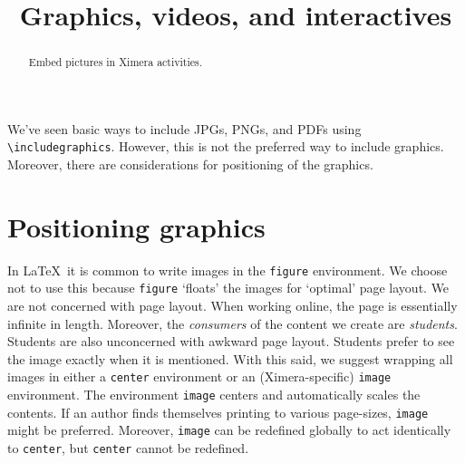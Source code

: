 \documentclass{ximera}
\title{Graphics, videos, and interactives}
\begin{document}
\begin{abstract}
  Embed pictures in Ximera activities.
\end{abstract}
\maketitle

We've seen basic ways to include JPGs, PNGs, and PDFs using
\verb!\includegraphics!. However, this is not the preferred way to include
graphics. Moreover, there are considerations for positioning of the graphics.

\section{Positioning graphics}

In \LaTeX\ it is common to write images in the \verb!figure! environment. We
choose not to use this because \verb!figure! `floats' the images for `optimal'
page layout. We are not concerned with page layout. When working online, the
page is essentially infinite in length. Moreover, the \textit{consumers} of the
content we create are \textit{students}. Students are also unconcerned with
awkward page layout. Students prefer to see the image exactly when it is
mentioned. With this said, we suggest wrapping all images in either a
\verb!center! environment or an (Ximera-specific) \verb!image! environment.
The environment \verb!image! centers and automatically scales the contents.  If
an author finds themselves printing to various page-sizes, \verb!image! might
be preferred. Moreover, \verb!image! can be redefined globally to act
identically to \verb!center!, but \verb!center! cannot be redefined.
\end{document}
